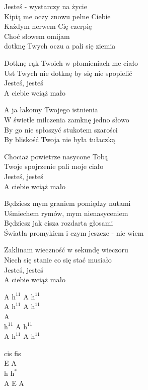 \begin{text}
    Jesteś - wystarczy na życie\\
    Kipią me oczy znowu pełne Ciebie\\
    Każdym nerwem Cię czerpię\\
    Choć słowem omijam\\
    dotknę Twych oczu a pali się ziemia

    Dotknę rąk Twoich w płomieniach me ciało\\
    Ust Twych nie dotknę by się nie spopielić\\
    Jesteś, jesteś\\
    A ciebie wciąż mało

    A ja łakomy Twojego istnienia\\
    W świetle milczenia zamknę jedno słowo\\
    By go nie spłoszyć stukotem szarości\\
    By bliskość Twoja nie była tułaczką

    Chociaż powietrze nasycone Tobą\\
    Twoje spojrzenie pali moje ciało\\
    Jesteś, jesteś\\
    A ciebie wciąż mało

    Będziesz mym graniem pomiędzy nutami\\
    Uśmiechem rymów, mym nienasyceniem\\
    Będziesz jak cisza rozdarta głosami\\
    Światła promykiem i czym jeszcze - nie wiem

    Zaklinam wieczność w sekundę wieczoru\\
    Niech się stanie co się stać musiało\\
    Jesteś, jesteś\\
    A ciebie wciąż mało
\end{text}
\begin{chord}
    A $\mathrm{h^{11}}$ A $\mathrm{h^{11}}$\\
    A $\mathrm{h^{11}}$ A $\mathrm{h^{11}}$\\
    A\\
    $\mathrm{h^{11}}$ A $\mathrm{h^{11}}$\\
    A $\mathrm{h^{11}}$ A $\mathrm{h^{11}}$

    cis fis\\
    E A\\
    h $\mathrm{h^{*}}$\\
    A E A

    \\
\end{chord}
